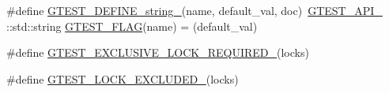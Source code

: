 \begin{DoxyCompactItemize}
$$\#define \hyperlink{gtest-port_8h_a885e18fe217a6e85553d408b99252c12}{G\+T\+E\+S\+T\+\_\+\+D\+E\+F\+I\+N\+E\+\_\+string\+\_\+}(name,  default\+\_\+val,  doc)~\hyperlink{gtest-port_8h_aa73be6f0ba4a7456180a94904ce17790}{G\+T\+E\+S\+T\+\_\+\+A\+P\+I\+\_\+} \+::std\+::string \hyperlink{gtest-port_8h_a828f4e34a1c4b510da50ec1563e3562a}{G\+T\+E\+S\+T\+\_\+\+F\+L\+AG}(name) = (default\+\_\+val)
\item 
\#define \hyperlink{gtest-port_8h_a149f693bd59fa1bc937af54c0cdcb32f}{G\+T\+E\+S\+T\+\_\+\+E\+X\+C\+L\+U\+S\+I\+V\+E\+\_\+\+L\+O\+C\+K\+\_\+\+R\+E\+Q\+U\+I\+R\+E\+D\+\_\+}(locks)
\item 
\#define \hyperlink{gtest-port_8h_a69abff5a4efdd07bd5faebe3dd318d06}{G\+T\+E\+S\+T\+\_\+\+L\+O\+C\+K\+\_\+\+E\+X\+C\+L\+U\+D\+E\+D\+\_\+}(locks)
\end{DoxyCompactItemize}
